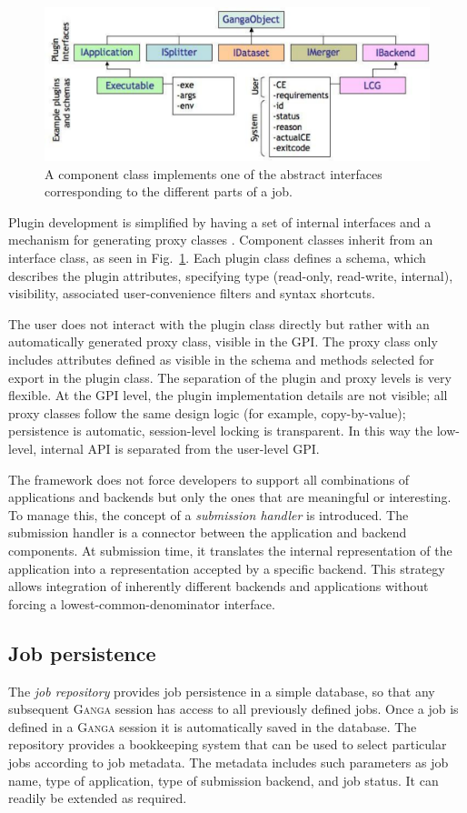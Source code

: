 \documentclass{elsart}
\def\ganga {\textsc{Ganga}\xspace}
\def\GPI{GPI\xspace}
\begin{document}
\begin{figure}
  \centering
  \includegraphics[width=14cm]{GangaPlugin.pdf}  
  \caption{A component class implements one of the abstract interfaces
    corresponding to the different parts of a job.}
  \label{fig:Components}
\end{figure}
Plugin development is simplified by having a set of internal interfaces and a
mechanism for generating proxy classes \cite{GoF}. Component classes inherit from an interface class,
as seen in Fig.~\ref{fig:Components}. Each plugin class defines a schema, which
describes the plugin attributes, specifying type
(read-only, read-write, internal), visibility, associated user-convenience filters
and syntax shortcuts.

The user does not interact with the plugin class directly but rather with an
automatically generated proxy class, visible in the \GPI. The proxy
class only includes attributes defined as visible in the schema and methods
selected for export in the plugin class. The separation of the plugin and
proxy levels is very flexible. At the \GPI level, the plugin implementation
details are not visible; all proxy classes follow the same design logic (for
example, copy-by-value); persistence is automatic, session-level locking
is transparent. In this way the low-level, internal API is
separated from the user-level \GPI.

The framework does not force developers to support all combinations of
applications and backends but only the ones that are meaningful or interesting. To manage
this, the concept of a {\em submission handler} is introduced. The submission
handler is a connector between the application and backend components. At
submission time, it translates the internal representation of the application
into a representation accepted by a specific backend. This strategy allows
integration of inherently different backends and applications without forcing
a lowest-common-denominator interface.


\subsection{Job persistence}
\label{sec:persistence}
The \emph{job repository} provides job persistence in a simple database,
so that any subsequent \ganga session has access to all previously
defined jobs. Once a job is defined in a \ganga session it is automatically
saved in the database. The repository provides a bookkeeping system that can
be used to select particular jobs according to job metadata. The metadata
includes such parameters as job name, type of application, type of submission
backend, and job status. It can readily be extended as required.
\end{document}
